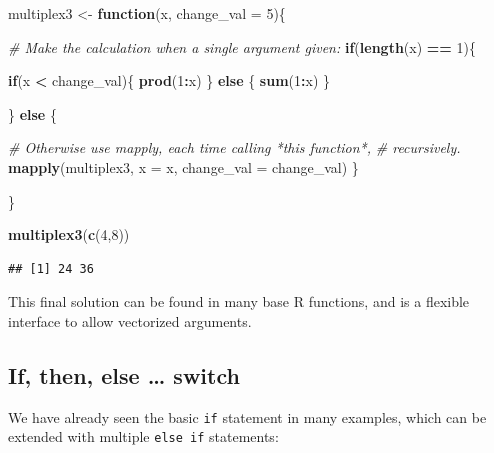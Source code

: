 \documentclass[]{book}
\newenvironment{Shaded}{\begin{snugshade}}{\end{snugshade}}
\newcommand{\CommentTok}[1]{\textcolor[rgb]{0.56,0.35,0.01}{\textit{#1}}}
\newcommand{\ControlFlowTok}[1]{\textcolor[rgb]{0.13,0.29,0.53}{\textbf{#1}}}
\newcommand{\DataTypeTok}[1]{\textcolor[rgb]{0.13,0.29,0.53}{#1}}
\newcommand{\DecValTok}[1]{\textcolor[rgb]{0.00,0.00,0.81}{#1}}
\newcommand{\KeywordTok}[1]{\textcolor[rgb]{0.13,0.29,0.53}{\textbf{#1}}}
\newcommand{\NormalTok}[1]{#1}
\newcommand{\OperatorTok}[1]{\textcolor[rgb]{0.81,0.36,0.00}{\textbf{#1}}}
\newcommand{\StringTok}[1]{\textcolor[rgb]{0.31,0.60,0.02}{#1}}
\begin{document}
\begin{Shaded}
\begin{Highlighting}[]
\NormalTok{multiplex3 <-}\StringTok{ }\ControlFlowTok{function}\NormalTok{(x, }\DataTypeTok{change_val =} \DecValTok{5}\NormalTok{)\{}
  
  \CommentTok{# Make the calculation when a single argument given:}
  \ControlFlowTok{if}\NormalTok{(}\KeywordTok{length}\NormalTok{(x) }\OperatorTok{==}\StringTok{ }\DecValTok{1}\NormalTok{)\{}
    
    \ControlFlowTok{if}\NormalTok{(x }\OperatorTok{<}\StringTok{ }\NormalTok{change_val)\{}
      \KeywordTok{prod}\NormalTok{(}\DecValTok{1}\OperatorTok{:}\NormalTok{x)}
\NormalTok{    \} }\ControlFlowTok{else}\NormalTok{ \{}
      \KeywordTok{sum}\NormalTok{(}\DecValTok{1}\OperatorTok{:}\NormalTok{x)}
\NormalTok{    \}  }
    
\NormalTok{  \} }\ControlFlowTok{else}\NormalTok{ \{}
    
    \CommentTok{# Otherwise use mapply, each time calling *this function*,}
    \CommentTok{# recursively.}
    \KeywordTok{mapply}\NormalTok{(multiplex3, }\DataTypeTok{x =}\NormalTok{ x, }\DataTypeTok{change_val =}\NormalTok{ change_val)}
\NormalTok{  \}}
  
\NormalTok{\}}

\KeywordTok{multiplex3}\NormalTok{(}\KeywordTok{c}\NormalTok{(}\DecValTok{4}\NormalTok{,}\DecValTok{8}\NormalTok{))}
\end{Highlighting}
\end{Shaded}

\begin{verbatim}
## [1] 24 36
\end{verbatim}

This final solution can be found in many base R functions, and is a flexible interface to allow vectorized arguments.

\hypertarget{if-then-else-switch}{%
\subsection{If, then, else \ldots{} switch}\label{if-then-else-switch}}

We have already seen the basic \texttt{if} statement in many examples, which can be extended with multiple \texttt{else\ if} statements:
\end{document}
